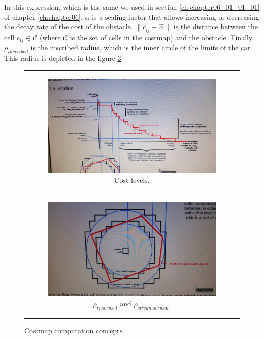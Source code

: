 In this expression, which is the same we used in section \ref{ch:chapter06_01_01_01} of chapter \ref{ch:chapter06}, $\alpha$ is a scaling factor that allows increasing or decreasing the decay rate of the cost of the obstacle. $\|c_{ij}-\vec{o}\|$ is the distance between the cell $c_{ij} \in \mathcal{C}$ (where $\mathcal{C}$ is the set of cells in the costmap) and the obstacle. Finally, $\rho_{inscribed}$ is the inscribed radius, which is the inner circle of the limits of the car. This radius is depicted in the figure \ref{fig:cp07_costmap_concepts}.

\begin{figure}[h!]
\centering
\begin{tabular}{c}
  \begin{subfigure}[b]{\textwidth}
    \centering
    \includegraphics[width=\textwidth]{cost_levels}
    \caption{Cost levels.}
    \label{fig:cp07_cost_levels}
  \end{subfigure}\\ 
  \begin{subfigure}[b]{\textwidth}
    \centering
    \includegraphics[width=\textwidth]{inscribed_circumscribed}
    \caption{$\rho_{inscribed}$ and $\rho_{circumscribed}$.}
    \label{fig:cp07_inscribed_circumscribed}
  \end{subfigure}
\end{tabular}
\caption{Costmap computation concepts.}\label{fig:cp07_costmap_concepts}
\end{figure}

